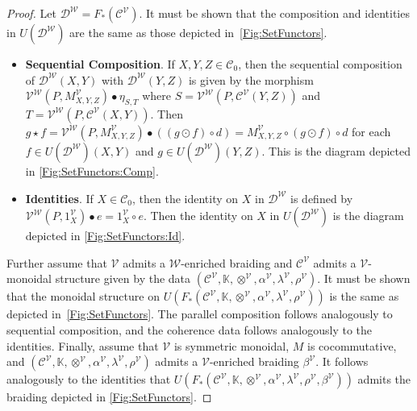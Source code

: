 \begin{proof}
    Let $\mathcal{D}^{\mathcal{W}} = F_*( \mathcal{C}^{\mathcal{V}} )$.
    It must be shown that the composition and identities in $U( \mathcal{D}^{\mathcal{W}} )$ are the same as those depicted in~\cref{Fig:SetFunctors}.
    \begin{itemize}
    \item \textbf{Sequential Composition}.
          If $X, Y, Z \in \mathcal{C}_0$,
          then the sequential composition of $\mathcal{D}^{\mathcal{W}}( X, Y )$ with $\mathcal{D}^{\mathcal{W}}( Y, Z )$ is given by the morphism $\mathcal{V}^{\mathcal{W}}( P, M_{X,Y,Z}^{\mathcal{V}} ) \bullet \eta_{S,T}$ where $S = \mathcal{V}^{\mathcal{W}}( P, \mathcal{C}^{\mathcal{V}}( Y, Z ) )$ and $T = \mathcal{V}^{\mathcal{W}}( P, \mathcal{C}^{\mathcal{V}}( X, Y ) )$.
          Then $g \star f = \mathcal{V}^{\mathcal{W}}( P, M_{X,Y,Z}^{\mathcal{V}} ) \bullet ( ( g \odot f ) \circ d ) =  M_{X,Y,Z}^{\mathcal{V}} \circ ( g \odot f ) \circ d$ for each $f \in U( \mathcal{D}^{\mathcal{W}} )( X, Y )$ and $g \in U( \mathcal{D}^{\mathcal{W}} )( Y, Z )$.
          This is the diagram depicted in \cref{Fig:SetFunctors:Comp}.
    \item \textbf{Identities}.
          If $X \in \mathcal{C}_0$, then the identity on $X$ in $\mathcal{D}^{\mathcal{W}}$ is defined by $\mathcal{V}^{\mathcal{W}}( P, 1_X^{\mathcal{V}} ) \bullet e = 1_X^{\mathcal{V}} \circ e$.
          Then the identity on $X$ in $U( \mathcal{D}^{\mathcal{W}} )$ is the diagram depicted in \cref{Fig:SetFunctors:Id}.
    \end{itemize}
    Further assume that $\mathcal{V}$ admits a $\mathcal{W}$-enriched braiding and $\mathcal{C}^{\mathcal{V}}$ admits a $\mathcal{V}$-monoidal structure given by the data $( \mathcal{C}^{\mathcal{V}}, \mathbb{K}, \otimes^{\mathcal{V}}, \alpha^{\mathcal{V}}, \lambda^{\mathcal{V}}, \rho^{\mathcal{V}} )$.
    It must be shown that the monoidal structure on $U( F_*( \mathcal{C}^{\mathcal{V}}, \mathbb{K}, \otimes^{\mathcal{V}}, \alpha^{\mathcal{V}}, \lambda^{\mathcal{V}}, \rho^{\mathcal{V}} ) )$ is the same as depicted in~\cref{Fig:SetFunctors}.
    The parallel composition follows analogously to sequential composition, and the coherence data follows analogously to the identities.
    Finally, assume that $\mathcal{V}$ is symmetric monoidal, $M$ is cocommutative, and $( \mathcal{C}^{\mathcal{V}}, \mathbb{K}, \otimes^{\mathcal{V}}, \alpha^{\mathcal{V}}, \lambda^{\mathcal{V}}, \rho^{\mathcal{V}} )$ admits a $\mathcal{V}$-enriched braiding $\beta^{\mathcal{V}}$.
    It follows analogously to the identities that $U( F_*( \mathcal{C}^{\mathcal{V}}, \mathbb{K}, \otimes^{\mathcal{V}}, \alpha^{\mathcal{V}}, \lambda^{\mathcal{V}}, \rho^{\mathcal{V}}, \beta^{\mathcal{V}} ) )$ admits the braiding depicted in \cref{Fig:SetFunctors}.
\end{proof}


